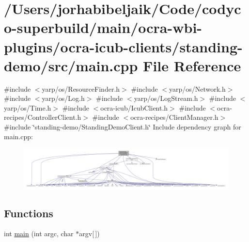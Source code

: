 \hypertarget{ocra-icub-clients_2standing-demo_2src_2main_8cpp}{}\section{/\+Users/jorhabibeljaik/\+Code/codyco-\/superbuild/main/ocra-\/wbi-\/plugins/ocra-\/icub-\/clients/standing-\/demo/src/main.cpp File Reference}
\label{ocra-icub-clients_2standing-demo_2src_2main_8cpp}
{\ttfamily \#include $<$yarp/os/\+Resource\+Finder.\+h$>$}\newline
{\ttfamily \#include $<$yarp/os/\+Network.\+h$>$}\newline
{\ttfamily \#include $<$yarp/os/\+Log.\+h$>$}\newline
{\ttfamily \#include $<$yarp/os/\+Log\+Stream.\+h$>$}\newline
{\ttfamily \#include $<$yarp/os/\+Time.\+h$>$}\newline
{\ttfamily \#include $<$ocra-\/icub/\+Icub\+Client.\+h$>$}\newline
{\ttfamily \#include $<$ocra-\/recipes/\+Controller\+Client.\+h$>$}\newline
{\ttfamily \#include $<$ocra-\/recipes/\+Client\+Manager.\+h$>$}\newline
{\ttfamily \#include \char`\"{}standing-\/demo/\+Standing\+Demo\+Client.\+h\char`\"{}}\newline
Include dependency graph for main.\+cpp\+:
\nopagebreak
\begin{figure}[H]
\begin{center}
\leavevmode
\includegraphics[width=350pt]{ocra-icub-clients_2standing-demo_2src_2main_8cpp__incl}
\end{center}
\end{figure}
\subsection*{Functions}
\begin{DoxyCompactItemize}
\item 
int \hyperlink{ocra-icub-clients_2standing-demo_2src_2main_8cpp_a0ddf1224851353fc92bfbff6f499fa97}{main} (int argc, char $\ast$argv\mbox{[}$\,$\mbox{]})
\end{DoxyCompactItemize}


